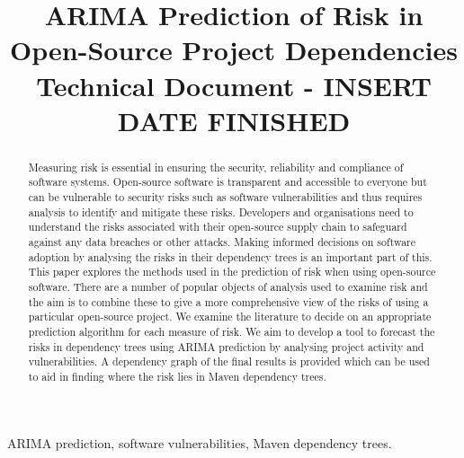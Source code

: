 \documentclass[conference]{IEEEtran}
\begin{document}
\title{ARIMA Prediction of Risk in \\Open-Source Project Dependencies\\
{\footnotesize Technical Document - INSERT DATE FINISHED}
}

\author{
\and
{}
    }

\maketitle
\thispagestyle{plain}
\pagestyle{plain}

\begin{abstract}
Measuring risk is essential in ensuring the security, reliability and compliance of software systems. Open-source software is transparent and accessible to everyone but can be vulnerable to security risks such as software vulnerabilities and thus requires analysis to identify and mitigate these risks. Developers and organisations need to understand the risks associated with their open-source supply chain to safeguard against any data breaches or other attacks. Making informed decisions on software adoption by analysing the risks in their dependency trees is an important part of this. This paper explores the methods used in the prediction of risk when using open-source software. There are a number of popular objects of analysis used to examine risk and the aim is to combine these to give a more comprehensive view of the risks of using a particular open-source project. We examine the literature to decide on an appropriate prediction algorithm for each measure of risk. We aim to develop a tool to forecast the risks in dependency trees using ARIMA prediction by analysing project activity and vulnerabilities. A dependency graph of the final results is provided which can be used to aid in finding where the risk lies in Maven dependency trees. 
\end{abstract}

\begin{IEEEkeywords}
ARIMA prediction, software vulnerabilities, Maven dependency trees.
\end{IEEEkeywords}
\end{document}
